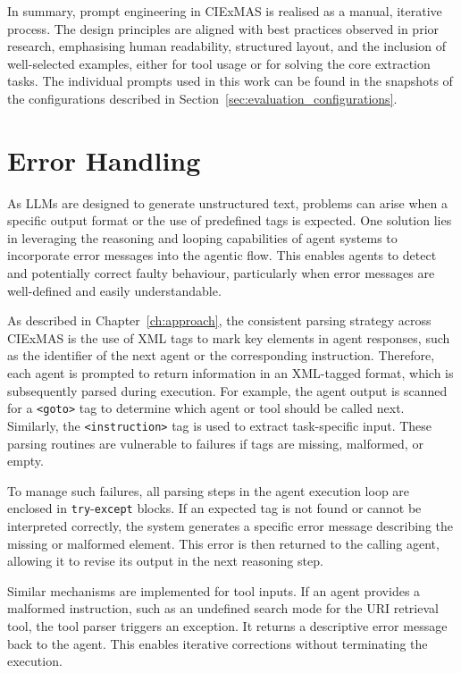 \documentclass[a4paper,oneside,bibliography=totoc]{scrbook}
\begin{document}
In summary, prompt engineering in CIExMAS is realised as a manual, iterative process. The design principles are aligned with best practices observed in prior research, emphasising human readability, structured layout, and the inclusion of well-selected examples, either for tool usage or for solving the core extraction tasks. The individual prompts used in this work can be found in the snapshots of the configurations described in Section~\ref{sec:evaluation_configurations}.

\section{Error Handling}
\label{sec:error_incorportion}

As \acp{LLM} are designed to generate unstructured text, problems can arise when a specific output format or the use of predefined tags is expected. One solution lies in leveraging the reasoning and looping capabilities of agent systems to incorporate error messages into the agentic flow. This enables agents to detect and potentially correct faulty behaviour, particularly when error messages are well-defined and easily understandable.

As described in Chapter~\ref{ch:approach}, the consistent parsing strategy across CIExMAS is the use of \ac{XML} tags to mark key elements in agent responses, such as the identifier of the next agent or the corresponding instruction. Therefore, each agent is prompted to return information in an \ac{XML}-tagged format, which is subsequently parsed during execution. For example, the agent output is scanned for a \texttt{<goto>} tag to determine which agent or tool should be called next. Similarly, the \texttt{<instruction>} tag is used to extract task-specific input. These parsing routines are vulnerable to failures if tags are missing, malformed, or empty.

To manage such failures, all parsing steps in the agent execution loop are enclosed in \texttt{try}-\texttt{except} blocks. If an expected tag is not found or cannot be interpreted correctly, the system generates a specific error message describing the missing or malformed element. This error is then returned to the calling agent, allowing it to revise its output in the next reasoning step.

Similar mechanisms are implemented for tool inputs. If an agent provides a malformed instruction, such as an undefined search mode for the \ac{URI} retrieval tool, the tool parser triggers an exception. It returns a descriptive error message back to the agent. This enables iterative corrections without terminating the execution.
\end{document}
